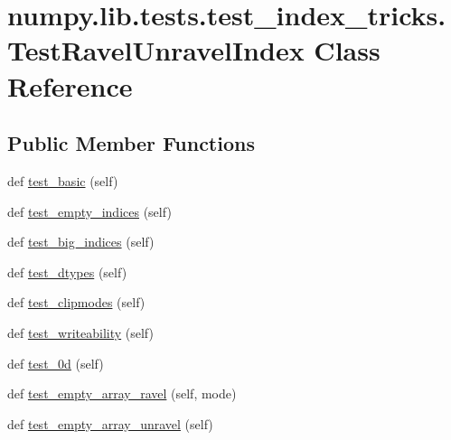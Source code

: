 \hypertarget{classnumpy_1_1lib_1_1tests_1_1test__index__tricks_1_1TestRavelUnravelIndex}{}\section{numpy.\+lib.\+tests.\+test\+\_\+index\+\_\+tricks.\+Test\+Ravel\+Unravel\+Index Class Reference}
\label{classnumpy_1_1lib_1_1tests_1_1test__index__tricks_1_1TestRavelUnravelIndex}
\subsection*{Public Member Functions}
\begin{DoxyCompactItemize}
\item 
def \hyperlink{classnumpy_1_1lib_1_1tests_1_1test__index__tricks_1_1TestRavelUnravelIndex_a76311847230bf0a71ae363010406adc0}{test\+\_\+basic} (self)
\item 
def \hyperlink{classnumpy_1_1lib_1_1tests_1_1test__index__tricks_1_1TestRavelUnravelIndex_abfb5b4233acd21d211437aaed66c3c5e}{test\+\_\+empty\+\_\+indices} (self)
\item 
def \hyperlink{classnumpy_1_1lib_1_1tests_1_1test__index__tricks_1_1TestRavelUnravelIndex_ab2fce9d03ec9e8947b414528bde5609f}{test\+\_\+big\+\_\+indices} (self)
\item 
def \hyperlink{classnumpy_1_1lib_1_1tests_1_1test__index__tricks_1_1TestRavelUnravelIndex_afec273e742bf50a1e31d902bf7277d90}{test\+\_\+dtypes} (self)
\item 
def \hyperlink{classnumpy_1_1lib_1_1tests_1_1test__index__tricks_1_1TestRavelUnravelIndex_a4b82248a1551af5699eb6da5778de197}{test\+\_\+clipmodes} (self)
\item 
def \hyperlink{classnumpy_1_1lib_1_1tests_1_1test__index__tricks_1_1TestRavelUnravelIndex_a0d043a758e45958f4b7c4d47df9e470a}{test\+\_\+writeability} (self)
\item 
def \hyperlink{classnumpy_1_1lib_1_1tests_1_1test__index__tricks_1_1TestRavelUnravelIndex_a9987fcfd41362a3080e9e41f3684bc49}{test\+\_\+0d} (self)
\item 
def \hyperlink{classnumpy_1_1lib_1_1tests_1_1test__index__tricks_1_1TestRavelUnravelIndex_a01c950cf04bdb94e32311501f2a79f22}{test\+\_\+empty\+\_\+array\+\_\+ravel} (self, mode)
\item 
def \hyperlink{classnumpy_1_1lib_1_1tests_1_1test__index__tricks_1_1TestRavelUnravelIndex_a8c128a69cd7644c73b56f5fc88d16099}{test\+\_\+empty\+\_\+array\+\_\+unravel} (self)
\end{DoxyCompactItemize}


